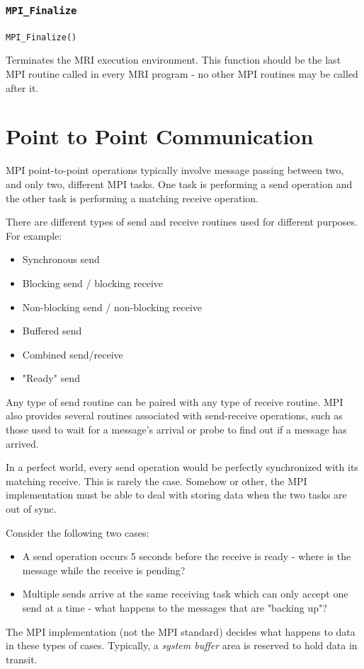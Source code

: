 \subsubsection{\texttt{MPI\_Finalize}}
\texttt{MPI\_Finalize()}

Terminates the MRI execution environment. This function should be the last MPI routine called in every MRI program - no other MPI routines may be called after it. 

\section{Point to Point Communication}
MPI point-to-point operations typically involve message passing between two, and only two, different MPI tasks. One task is performing a send operation and the other task is performing a matching receive operation. 

There are different types of send and receive routines used for different purposes. For example: 
\begin{itemize}
\item Synchronous send 
\item Blocking send / blocking receive 
\item Non-blocking send / non-blocking receive 
\item Buffered send 
\item Combined send/receive 
\item "Ready" send 
\end{itemize}

Any type of send routine can be paired with any type of receive routine. MPI also provides several routines associated with send-receive operations, such as those used to wait for a message's arrival or probe to find out if a message has arrived. 

In a perfect world, every send operation would be perfectly synchronized with its matching receive. This 
is rarely the case. Somehow or other, the MPI implementation must be able to deal with storing data when the two tasks are out of sync. 

Consider the following two cases: 
\begin{itemize}
\item A send operation occurs 5 seconds before the receive is ready - where is the message while the receive is pending? 
\item Multiple sends arrive at the same receiving task which can only accept one send at a time - what happens to the messages that are "backing up"? 
\end{itemize}
The MPI implementation (not the MPI standard) decides what happens to data in these types of cases. Typically, a \textit{system buffer} area is reserved to hold data in transit. 

